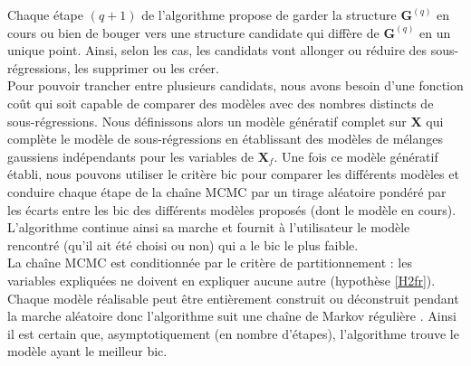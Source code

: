 \documentclass[12pt,a4paper]{report}
\begin{document}
		Chaque étape $(q+1)$ de l'algorithme propose de garder la structure $\boldsymbol{G}^{(q)}$ en cours ou bien de bouger vers une structure candidate qui diffère de $\boldsymbol{G}^{(q)}$ en un unique point. Ainsi, selon les cas, les candidats vont allonger ou réduire des sous-régressions, les supprimer ou les créer. \\
		Pour pouvoir trancher entre plusieurs candidats, nous avons besoin d'une fonction coût qui soit capable de comparer des modèles avec des nombres distincts de sous-régressions. Nous définissons alors un modèle génératif complet sur $\boldsymbol{X}$ qui complète le modèle de sous-régressions en établissant des modèles de mélanges gaussiens indépendants pour les variables de $\boldsymbol{X}_{f}$. Une fois ce modèle génératif établi, nous pouvons utiliser le critère {\sc bic} pour comparer les différents modèles et conduire chaque étape de la chaîne MCMC par un tirage aléatoire pondéré par les écarts entre les {\sc bic} des différents modèles proposés (dont le modèle en cours). L'algorithme continue ainsi sa marche et fournit à l'utilisateur le modèle rencontré (qu'il ait été choisi ou non) qui a le {\sc bic} le plus faible. \\
		
		La chaîne MCMC est conditionnée par le critère de partitionnement : les variables expliquées ne doivent en expliquer aucune autre (hypothèse \ref{H2fr}). Chaque modèle réalisable peut être entièrement construit ou déconstruit pendant la marche aléatoire donc l'algorithme suit une chaîne de Markov régulière \cite{grinstead1997introduction}. Ainsi il est certain que, asymptotiquement (en nombre d'étapes), l'algorithme trouve le modèle ayant le meilleur {\sc bic}.
\end{document}
